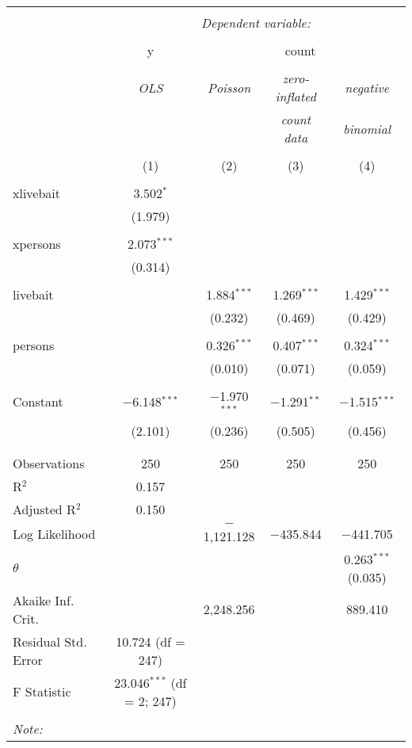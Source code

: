 \begin{table}[!htbp] \centering 
  \caption{} 
  \label{} 
\begin{tabular}{@{\extracolsep{5pt}}lcccc} 
\\[-1.8ex]\hline 
\hline \\[-1.8ex] 
 & \multicolumn{4}{c}{\textit{Dependent variable:}} \\ 
\cline{2-5} 
\\[-1.8ex] & y & \multicolumn{3}{c}{count} \\ 
\\[-1.8ex] & \textit{OLS} & \textit{Poisson} & \textit{zero-inflated} & \textit{negative} \\ 
 & \textit{} & \textit{} & \textit{count data} & \textit{binomial} \\ 
\\[-1.8ex] & (1) & (2) & (3) & (4)\\ 
\hline \\[-1.8ex] 
 xlivebait & 3.502$^{*}$ &  &  &  \\ 
  & (1.979) &  &  &  \\ 
  & & & & \\ 
 xpersons & 2.073$^{***}$ &  &  &  \\ 
  & (0.314) &  &  &  \\ 
  & & & & \\ 
 livebait &  & 1.884$^{***}$ & 1.269$^{***}$ & 1.429$^{***}$ \\ 
  &  & (0.232) & (0.469) & (0.429) \\ 
  & & & & \\ 
 persons &  & 0.326$^{***}$ & 0.407$^{***}$ & 0.324$^{***}$ \\ 
  &  & (0.010) & (0.071) & (0.059) \\ 
  & & & & \\ 
 Constant & $-$6.148$^{***}$ & $-$1.970$^{***}$ & $-$1.291$^{**}$ & $-$1.515$^{***}$ \\ 
  & (2.101) & (0.236) & (0.505) & (0.456) \\ 
  & & & & \\ 
\hline \\[-1.8ex] 
Observations & 250 & 250 & 250 & 250 \\ 
R$^{2}$ & 0.157 &  &  &  \\ 
Adjusted R$^{2}$ & 0.150 &  &  &  \\ 
Log Likelihood &  & $-$1,121.128 & $-$435.844 & $-$441.705 \\ 
$\theta$ &  &  &  & 0.263$^{***}$  (0.035) \\ 
Akaike Inf. Crit. &  & 2,248.256 &  & 889.410 \\ 
Residual Std. Error & 10.724 (df = 247) &  &  &  \\ 
F Statistic & 23.046$^{***}$ (df = 2; 247) &  &  &  \\ 
\hline 
\hline \\[-1.8ex] 
\textit{Note:}  & \multicolumn{4}{r}{} \\ 
\end{tabular} 
\end{table} 